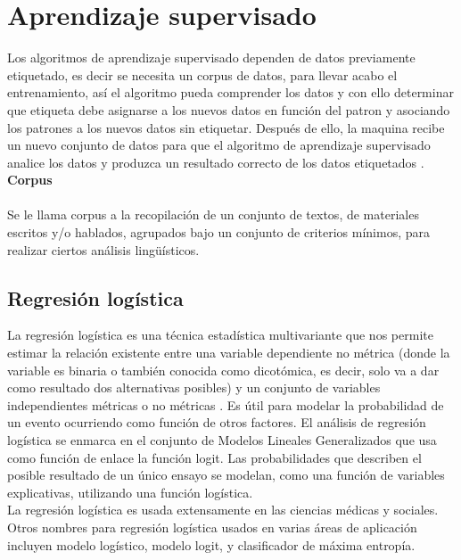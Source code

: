 \section[A Supervisado]{Aprendizaje supervisado}

Los algoritmos de aprendizaje supervisado dependen de datos previamente etiquetado, es decir se necesita un corpus de datos, para llevar acabo el entrenamiento, así 
el algoritmo pueda comprender los datos y con ello determinar que etiqueta debe asignarse a los nuevos datos 
en función del patron y asociando los patrones a los nuevos datos sin etiquetar. Después de ello, la maquina recibe 
un nuevo conjunto de datos para que el algoritmo de aprendizaje supervisado analice los datos y produzca un resultado 
correcto de los datos etiquetados \citep{CT4}.\\

\textbf{Corpus}\\\\

Se le llama corpus a la recopilación de un conjunto de textos, de materiales escritos y/o hablados, 
agrupados bajo un conjunto de criterios mínimos, para realizar ciertos análisis lingüísticos.



\subsection{Regresión logística}

La regresión logística es una técnica estadística multivariante que nos permite estimar la relación existente entre una variable dependiente 
no métrica (donde la variable es binaria o también conocida como dicotómica, es decir, solo va a dar como resultado dos alternativas posibles) 
y un conjunto de variables independientes métricas o no métricas \citep{CT6}. Es útil para modelar la probabilidad de un evento ocurriendo como 
función de otros factores. El análisis de regresión logística se enmarca en el conjunto de Modelos Lineales Generalizados que usa como función de 
enlace la función logit. Las probabilidades que describen el posible resultado de un único ensayo se modelan, como una función de variables explicativas, 
utilizando una función logística.\\

La regresión logística es usada extensamente en las ciencias médicas y sociales. Otros nombres para regresión logística usados en varias áreas de 
aplicación incluyen modelo logístico, modelo logit, y clasificador de máxima entropía.

